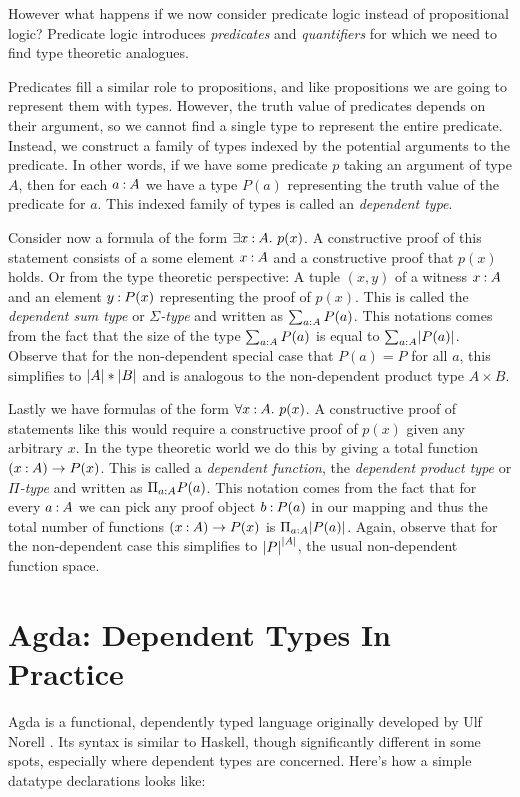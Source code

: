 However what happens if we now consider predicate logic instead of propositional logic? Predicate logic introduces \emph{predicates} and \emph{quantifiers} for which we need to find type theoretic analogues. 

Predicates fill a similar role to propositions, and like propositions we are going to represent them with types. However, the truth value of predicates depends on their argument, so we cannot find a single type to represent the entire predicate. Instead, we construct a family of types indexed by the potential arguments to the predicate. In other words, if we have some predicate $p$ taking an argument of type $A$, then for each $a \mathbin{:} A$ we have a type $P(a)$ representing the truth value of the predicate for $a$. This indexed family of types is called an \emph{dependent type}.

Consider now a formula of the form $\exists x \mathbin{:} A.~p(x)$. A constructive proof of this statement consists of a some element $x \mathbin{:} A$ and a constructive proof that $p(x)$ holds. Or from the type theoretic perspective: A tuple $(x , y)$ of a witness $x \mathbin{:} A$ and an element $y \mathbin{:} P(x)$ representing the proof of $p(x)$. This is called the \emph{dependent sum type} or $\Sigma$\emph{-type} and written as $\sum_{a \mathbin{:} A}P(a)$. This notations comes from the fact that the size of the type $\sum_{a \mathbin{:} A}P(a)$ is equal to $\sum_{a \mathbin{:} A} \lvert P(a)\rvert$. Observe that for the non-dependent special case that $P(a) = P$ for all $a$, this simplifies to $\lvert A\rvert * \lvert B\rvert$ and is analogous to the non-dependent product type $A \times B$.

Lastly we have formulas of the form $\forall x \mathbin{:} A.~p(x)$. A constructive proof of statements like this would require a constructive proof of $p(x)$ given any arbitrary $x$. In the type theoretic world we do this by giving a total function $(x \mathbin{:} A) \to P(x)$. This is called a \emph{dependent function}, the \emph{dependent product type} or $\Pi$\emph{-type} and written as $\Pi_{a \mathbin{:} A} P(a)$. This notation comes from the fact that for every $a \mathbin{:} A$ we can pick any proof object $b \mathbin{:} P(a)$ in our mapping and thus the total number of functions $(x \mathbin{:} A) \to P(x)$ is $\Pi_{a \mathbin{:} A} \lvert P(a)\rvert$. Again, observe that for the non-dependent case this simplifies to ${\lvert P\rvert}^{\lvert A\rvert}$, the usual non-dependent function space.

\section{Agda: Dependent Types In Practice}
Agda is a functional, dependently typed language originally developed by Ulf Norell \cite{norell:thesis}. Its syntax is similar to Haskell, though significantly different in some spots, especially where dependent types are concerned. Here's how a simple datatype declarations looks like:

